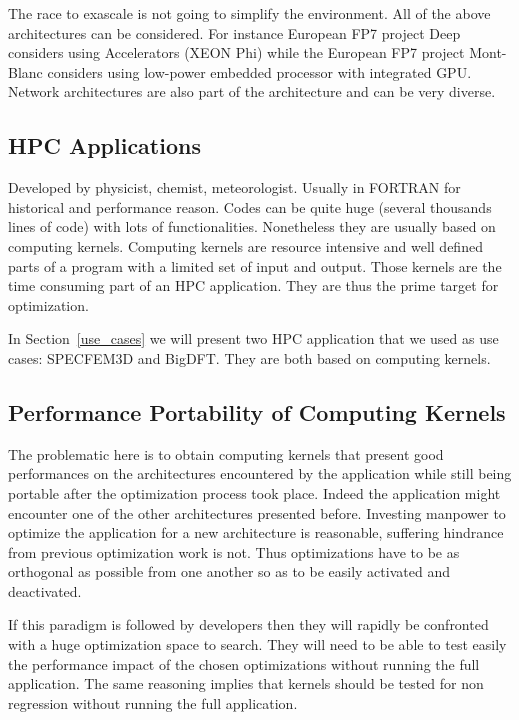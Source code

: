 \documentclass[review]{elsarticle}
\begin{document}
The race to exascale is not going to simplify the environment. All of the
above architectures can be considered. For instance European FP7 project Deep
considers using Accelerators (XEON Phi) while the European FP7 project
Mont-Blanc considers using low-power embedded processor with integrated
GPU. Network architectures are also part of the architecture and can be
very diverse.

  \subsection{HPC Applications}

Developed by physicist, chemist, meteorologist. Usually in FORTRAN for
historical and performance reason. Codes can be quite huge (several
thousands lines of code) with lots of functionalities. Nonetheless they are
usually based on computing kernels. Computing kernels are resource
intensive and well defined parts of a program with a limited set of input
and output. Those kernels are the time consuming part of an HPC
application. They are thus the prime target for optimization.

In Section~\ref{use_cases} we will present two HPC application that we used
as use cases: SPECFEM3D and BigDFT. They are both based on computing
kernels.

  \subsection{Performance Portability of Computing Kernels}

The problematic here is to obtain computing kernels that present good
performances on the architectures encountered by the application while
still being portable after the optimization process took place. Indeed the
application might encounter one of the other architectures presented
before. Investing manpower to optimize the application for a new
architecture is reasonable, suffering hindrance from previous optimization
work is not. Thus optimizations have to be as orthogonal as possible from
one another so as to be easily activated and deactivated.

If this paradigm is followed by developers then they will rapidly be
confronted with a huge optimization space to search. They will need to
be able to test easily the performance impact of the chosen optimizations
without running the full application. The same reasoning implies that
kernels should be tested for non regression without running the full
application.
\end{document}
